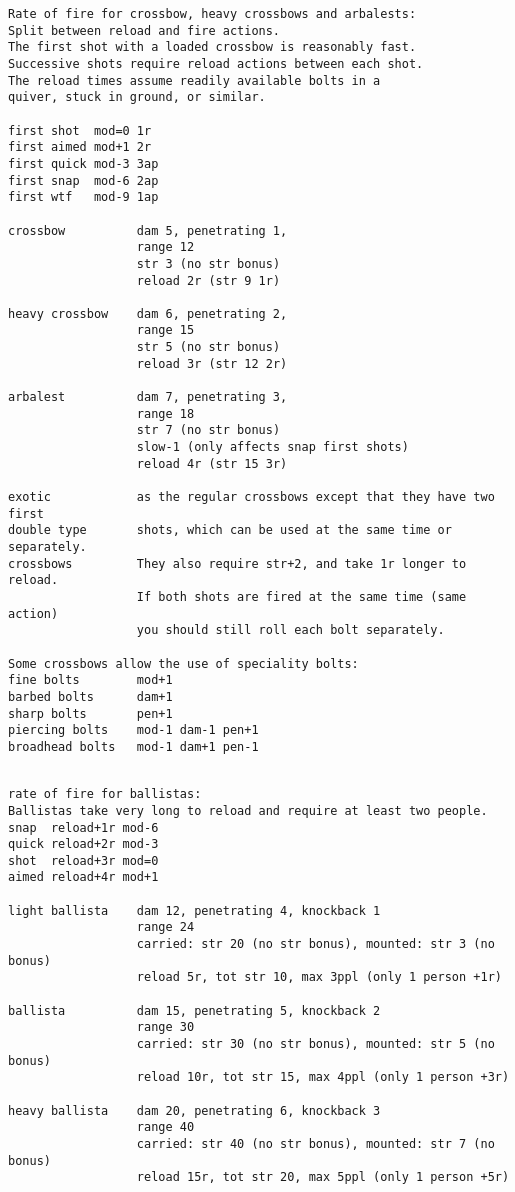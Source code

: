 \begin{verbatim}
\end{verbatim} \pagebreak[1] \begin{verbatim}
Rate of fire for crossbow, heavy crossbows and arbalests:
Split between reload and fire actions.
The first shot with a loaded crossbow is reasonably fast.
Successive shots require reload actions between each shot.
The reload times assume readily available bolts in a 
quiver, stuck in ground, or similar.

first shot  mod=0 1r
first aimed mod+1 2r
first quick mod-3 3ap
first snap  mod-6 2ap
first wtf   mod-9 1ap

crossbow          dam 5, penetrating 1,
                  range 12
                  str 3 (no str bonus)
                  reload 2r (str 9 1r)

heavy crossbow    dam 6, penetrating 2,
                  range 15
                  str 5 (no str bonus)
                  reload 3r (str 12 2r)

arbalest          dam 7, penetrating 3,
                  range 18
                  str 7 (no str bonus)
                  slow-1 (only affects snap first shots)
                  reload 4r (str 15 3r)

exotic            as the regular crossbows except that they have two first
double type       shots, which can be used at the same time or separately.
crossbows         They also require str+2, and take 1r longer to reload.
                  If both shots are fired at the same time (same action)
                  you should still roll each bolt separately.

Some crossbows allow the use of speciality bolts:
fine bolts        mod+1
barbed bolts      dam+1
sharp bolts       pen+1
piercing bolts    mod-1 dam-1 pen+1
broadhead bolts   mod-1 dam+1 pen-1


\end{verbatim} \pagebreak[1] \begin{verbatim}
rate of fire for ballistas:
Ballistas take very long to reload and require at least two people.
snap  reload+1r mod-6
quick reload+2r mod-3
shot  reload+3r mod=0
aimed reload+4r mod+1

light ballista    dam 12, penetrating 4, knockback 1
                  range 24
                  carried: str 20 (no str bonus), mounted: str 3 (no bonus)
                  reload 5r, tot str 10, max 3ppl (only 1 person +1r)

ballista          dam 15, penetrating 5, knockback 2
                  range 30
                  carried: str 30 (no str bonus), mounted: str 5 (no bonus)
                  reload 10r, tot str 15, max 4ppl (only 1 person +3r)

heavy ballista    dam 20, penetrating 6, knockback 3
                  range 40
                  carried: str 40 (no str bonus), mounted: str 7 (no bonus)
                  reload 15r, tot str 20, max 5ppl (only 1 person +5r)

\end{verbatim}
\normalsize








